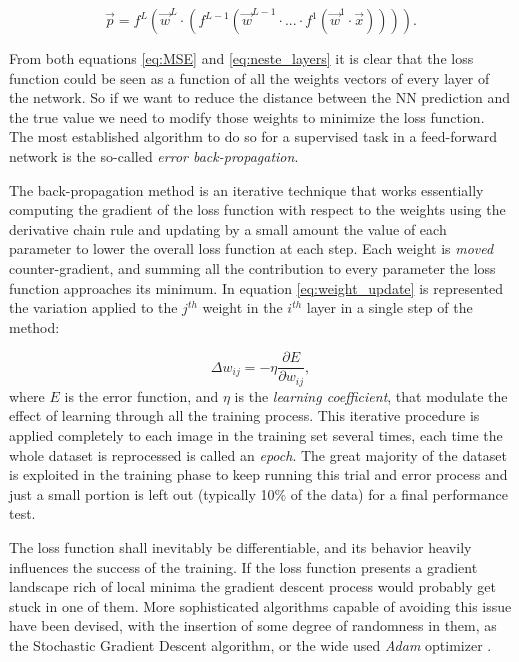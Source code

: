 \begin{equation}
    \vec p = f^L(\vec w^L \cdot (f^{L-1}(\vec w^{L-1} \cdot ... \cdot f^1(\vec w^1 \cdot \vec x)))).
    \label{eq:neste_layers}
\end{equation}

From both equations \ref{eq:MSE} and \ref{eq:neste_layers} it is clear that the loss function could be seen as a function of all the weights vectors of every layer of the network. So if we want to reduce the distance between the NN prediction and the true value we need to modify those weights to minimize the loss function. The most established algorithm to do so for a supervised task in a feed-forward network is the so-called \textit{error back-propagation}.

The back-propagation method is an iterative technique that works essentially computing the gradient of the loss function with respect to the weights using the derivative chain rule and updating by a small amount the value of each parameter to lower the overall loss function at each step. Each weight is  \textit{moved} counter-gradient, and summing all the contribution to every parameter the loss function approaches its minimum. In equation \ref{eq:weight_update} is represented the variation applied to the $j^{th}$ weight in the $i^{th}$ layer in a single step of the method:

\begin{equation}
    \Delta w_{ij} = - \eta \frac{\partial E}{\partial w_{ij}},
    \label{eq:weight_update}
\end{equation}
where $E$ is the error function, and $\eta$ is the \textit{learning coefficient}, that modulate the effect of learning through all the training process. This iterative procedure is applied completely to each image in the training set several times, each time the whole dataset is reprocessed is called an \textit{epoch}. The great majority of the dataset is exploited in the training phase to keep running this trial and error process and just a small portion is left out (typically 10\% of the data) for a final performance test.

The loss function shall inevitably be differentiable, and its behavior heavily influences the success of the training. If the loss function presents a gradient landscape rich of local minima the gradient descent process would probably get stuck in one of them. More sophisticated algorithms capable of avoiding this issue have been devised, with the insertion of some degree of randomness in them, as the Stochastic Gradient Descent algorithm, or the wide used \textit{Adam} optimizer \cite{1412.6980}.

